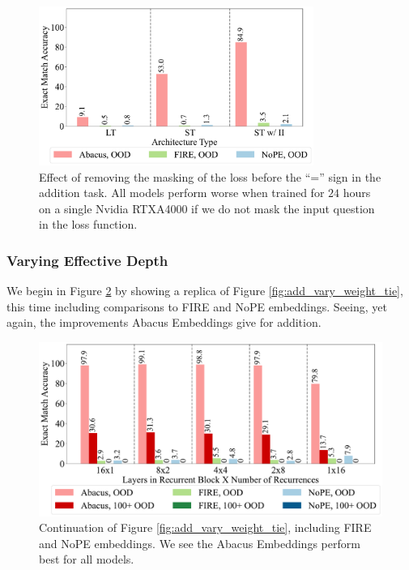 \documentclass{article}
\begin{document}
\begin{figure}[ht!]
    \centering
    \includegraphics[width=0.8\textwidth]{Figures/plot_five_2_bars.pdf}
    \caption{
    Effect of removing the masking of the loss before the ``='' sign in the addition task.
    All models perform worse when trained for $24$ hours on a single Nvidia RTXA4000 if we do not mask the input question in the loss function.
    }
    \label{fig:app_remove_mask_bf_eq}
\end{figure}

\subsubsection{Varying Effective Depth}
\label{app-subsec:vary-depth}

We begin in Figure \ref{fig:app_vary_weight_tie_inc_fire_nope} by showing a replica of Figure \ref{fig:add_vary_weight_tie}, this time including comparisons to FIRE and NoPE embeddings.
Seeing, yet again, the improvements Abacus Embeddings give for addition.

\begin{figure}[ht!]
    \centering
    \includegraphics[width=\textwidth]{Figures/plot_four_2_bars.pdf}
    \caption{
    Continuation of Figure \ref{fig:add_vary_weight_tie}, including FIRE and NoPE embeddings.
    We see the Abacus Embeddings perform best for all models.
    }
    \label{fig:app_vary_weight_tie_inc_fire_nope}
\end{figure}
\end{document}

